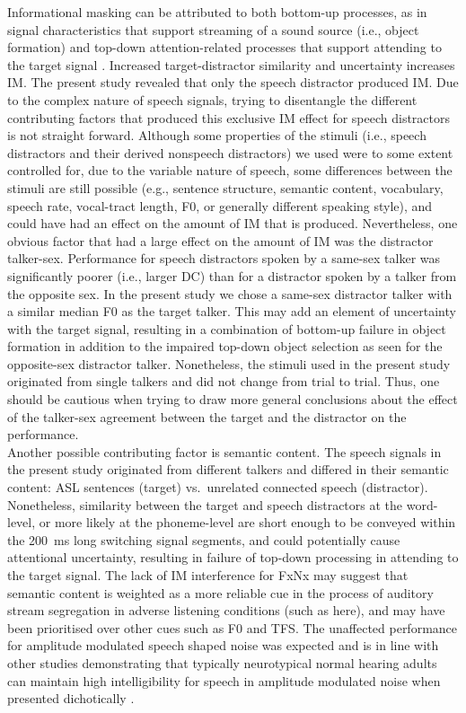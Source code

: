 \documentclass[a4paper, twoside]{templates/ociamthesis}
\begin{document}
Informational masking can be attributed to both bottom-up processes, as in signal characteristics that support streaming of a sound source (i.e., object formation) and top-down attention-related processes that support attending to the target signal \autocite[i.e., object selection;][]{Shinn-Cunningham2008}. Increased target-distractor similarity and uncertainty increases IM. The present study revealed that only the speech distractor produced IM. Due to the complex nature of speech signals, trying to disentangle the different contributing factors that produced this exclusive IM effect for speech distractors is not straight forward. Although some properties of the stimuli (i.e., speech distractors and their derived nonspeech distractors) we used were to some extent controlled for, due to the variable nature of speech, some differences between the stimuli are still possible (e.g., sentence structure, semantic content, vocabulary, speech rate, vocal-tract length, F0, or generally different speaking style), and could have had an effect on the amount of IM that is produced. Nevertheless, one obvious factor that had a large effect on the amount of IM was the distractor talker-sex. Performance for speech distractors spoken by a same-sex talker was significantly poorer (i.e., larger DC) than for a distractor spoken by a talker from the opposite sex. In the present study we chose a same-sex distractor talker with a similar median F0 as the target talker. This may add an element of uncertainty with the target signal, resulting in a combination of bottom-up failure in object formation in addition to the impaired top-down object selection as seen for the opposite-sex distractor talker. Nonetheless, the stimuli used in the present study originated from single talkers and did not change from trial to trial. Thus, one should be cautious when trying to draw more general conclusions about the effect of the talker-sex agreement between the target and the distractor on the performance.\\

Another possible contributing factor is semantic content. The speech signals in the present study originated from different talkers and differed in their semantic content: ASL sentences (target) vs.~unrelated connected speech (distractor). Nonetheless, similarity between the target and speech distractors at the word-level, or more likely at the phoneme-level are short enough to be conveyed within the 200~ms long switching signal segments, and could potentially cause attentional uncertainty, resulting in failure of top-down processing in attending to the target signal. The lack of IM interference for FxNx may suggest that semantic content is weighted as a more reliable cue in the process of auditory stream segregation in adverse listening conditions (such as here), and may have been prioritised over other cues such as F0 and TFS. The unaffected performance for amplitude modulated speech shaped noise was expected and is in line with other studies demonstrating that typically neurotypical normal hearing adults can maintain high intelligibility for speech in amplitude modulated noise when presented dichotically \autocite[e.g.,][]{Brungart2013}.\\
\end{document}
